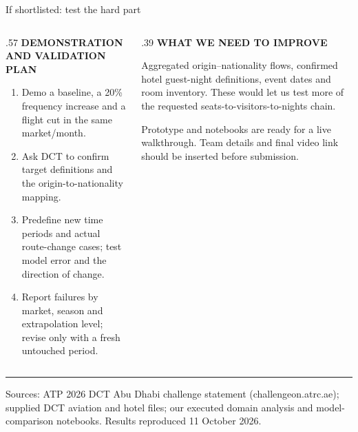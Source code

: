 \documentclass[aspectratio=169,10pt]{beamer}
\newcommand{\kicker}[1]{{\color{Accent}\scriptsize\bfseries\MakeUppercase{#1}}\par\vspace{.16cm}}
\newcommand{\smallnote}[1]{{\color{Muted}\scriptsize #1}}
\begin{document}
\begin{frame}{If shortlisted: test the hard part}
  \begin{columns}[T,totalwidth=\linewidth]
    \begin{column}{.57\linewidth}
      \kicker{Demonstration and validation plan}
      \begin{enumerate}\setlength\itemsep{.12cm}
        \item Demo a baseline, a 20\% frequency increase and a flight cut in the same market/month.
        \item Ask DCT to confirm target definitions and the origin-to-nationality mapping.
        \item Predefine new time periods and actual route-change cases; test model error and the direction of change.
        \item Report failures by market, season and extrapolation level; revise only with a fresh untouched period.
      \end{enumerate}
    \end{column}
    \begin{column}{.39\linewidth}
      \kicker{What we need to improve}
      Aggregated origin--nationality flows, confirmed hotel guest-night definitions, event dates and room inventory. These would let us test more of the requested seats-to-visitors-to-nights chain.

      \vspace{.40cm}
      \smallnote{Prototype and notebooks are ready for a live walkthrough. Team details and final video link should be inserted before submission.}
    \end{column}
  \end{columns}
  \vfill
  {\color{Rule}\rule{\linewidth}{.5pt}}\par
  \tiny Sources: ATP 2026 DCT Abu Dhabi challenge statement (challengeon.atrc.ae); supplied DCT aviation and hotel files; our executed domain analysis and model-comparison notebooks. Results reproduced 11 October 2026.
\end{frame}
\end{document}
